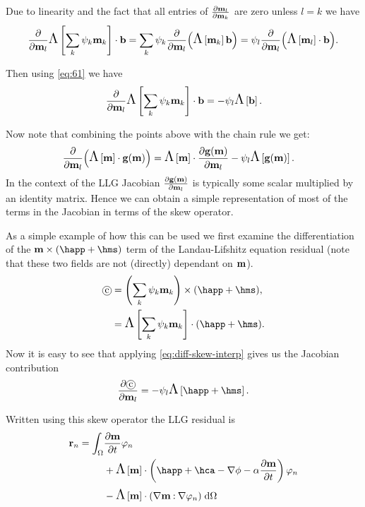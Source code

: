 \begin{itemize}
  Due to linearity and the fact that all entries of $\frac{\partial \mathbf{m}_{l}}{\partial \mathbf{m}_{k}}$ are zero unless $l=k$ we have
  \begin{equation}
    \frac{\partial }{\partial \mathbf{m}_l} \text{\Large{$\Lambda$}}\left[ \sum_{k} {\psi_k} \mathbf{m}_{k} \right] \cdot {\mathbf{b}} = \sum_k \psi_k \frac{\partial }{\partial \mathbf{m}_l} {\left( \text{\Large{$\Lambda$}}\left[ \mathbf{m}_k \right] {\mathbf{b}} \right)} = \psi_l \frac{\partial }{\partial \mathbf{m}_l} {\left( \text{\Large{$\Lambda$}}\left[ \mathbf{m}_l \right] \cdot {\mathbf{b}} \right)}.
  \end{equation}

  Then using \eqref{eq:61} we have
  \begin{equation}
    \frac{\partial }{\partial \mathbf{m}_l} \text{\Large{$\Lambda$}}\left[ \sum_{k} {\psi_k} \mathbf{m}_{k} \right] \cdot {\mathbf{b}} = - \psi_l\text{\Large{$\Lambda$}}\left[ {\mathbf{b}} \right].
    \label{eq:diff-skew-interp}
  \end{equation}

\end{itemize}

Now note that combining the points above with the chain rule we get:
  \begin{equation}
    \begin{aligned}
      \frac{\partial }{\partial \mathbf{m}_l} {\left( \text{\Large{$\Lambda$}}\left[ \mathbf{m} \right]\cdot {\mathbf{g}}(\mathbf{m}) \right)} 
      &= \text{\Large{$\Lambda$}}\left[ \mathbf{m} \right]\cdot \frac{\partial {\mathbf{g}}(\mathbf{m})}{\partial \mathbf{m}_l} - \psi_l \text{\Large{$\Lambda$}}\left[ {\mathbf{g}}(\mathbf{m}) \right].
    \end{aligned}
  \end{equation}
In the context of the LLG Jacobian $\frac{\partial {\mathbf{g}}(\mathbf{m})}{\partial \mathbf{m}_l}$ is typically some scalar multiplied by an identity matrix.
Hence we can obtain a simple representation of most of the terms in the Jacobian in terms of the skew operator.

As a simple example of how this can be used we first examine the differentiation of the $\mv \times (\happ + \hms)$ term of the Landau-Lifshitz equation residual (note that these two fields are not (directly) dependant on $\mathbf{m}$).
\begin{align}
  \circled{c} &= \intpb{\mv} \times (\happ + \hms), \notag\\
              &= \skewm{\intp{\mv}} \cdot (\happ + \hms).
\end{align}
Now it is easy to see that applying \eqref{eq:diff-skew-interp} gives us the Jacobian contribution
\begin{align}
  \pd{\circled{c}}{\mv_l} = - \sbf_l \skewm{\happ + \hms}.
\end{align}

Written using this skew operator the LLG residual is
\begin{equation}
  \begin{aligned}
    \rllg_n = \int_{\magd}
      & \dmdt \tbf_n \\
      &+ \skewm{\mv} \cdot \left( \happ + \hca - \nabla \phi - \dampc \dmdt
        \right) \tbf_n \\
      &- \skewm{\mv} \cdot (\grad \mv \compdot \grad \tbf_n)
      \d\magd
  \end{aligned}
\end{equation} 


